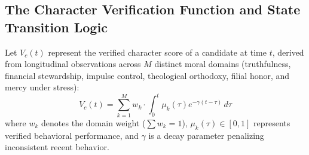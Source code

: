\documentclass[11pt,twocolumn]{article}
\begin{document}
\subsection{The Character Verification Function and State Transition Logic}
Let $V_c(t)$ represent the verified character score of a candidate at time $t$, derived from longitudinal observations across $M$ distinct moral domains (truthfulness, financial stewardship, impulse control, theological orthodoxy, filial honor, and mercy under stress):
\begin{equation}
V_c(t) = \sum_{k=1}^{M} w_k \cdot \int_{0}^{t} \mu_k(\tau) e^{-\gamma (t - \tau)} \, d\tau
\end{equation}
where $w_k$ denotes the domain weight ($\sum w_k = 1$), $\mu_k(\tau) \in [0, 1]$ represents verified behavioral performance, and $\gamma$ is a decay parameter penalizing inconsistent recent behavior.
\end{document}
